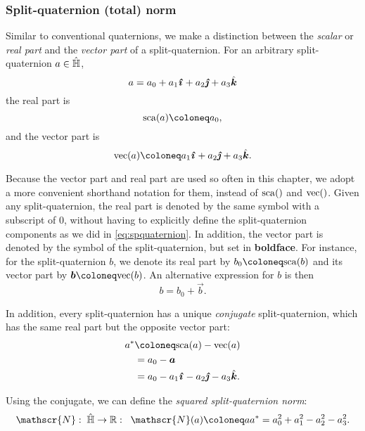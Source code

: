 \subsubsection{Split-quaternion (total) norm} 
Similar to conventional quaternions, we make a distinction between the \emph{scalar} or \emph{real part} and the \emph{vector part} of a split-quaternion. For an arbitrary split-quaternion \(a \in \hat{\mathbb{H}}\), \cite{Jafari2014}
\begin{equation}
     a = \quat{a_0}{a_1}{a_2}{a_3}
     \label{eq:spquaternion}
\end{equation}
the real part is 
\begin{equation}
    \scapart{a} \coloneq a_0,
\end{equation}
and the vector part is 
\begin{equation} 
    \vecpart{a} \coloneq \quatvec{a_1}{a_2}{a_3}.
\end{equation}

Because the vector part and real part are used so often in this chapter, we adopt a more convenient shorthand notation for them, instead of $\mathrm{sca}\qty()$ and $\mathrm{vec}\qty()$. Given any split-quaternion, the real part is denoted by the same symbol with a subscript of 0, without having to explicitly define the split-quaternion components as we did in \cref{eq:spquaternion}. In addition, the vector part is denoted by the symbol of the split-quaternion, but set in \textbf{boldface}. For instance, for the split-quaternion $b$, we denote its real part by $b_0 \coloneq \scapart{b}$ and its vector part by $\vec{b} \coloneq \vecpart{b}$. An alternative expression for $b$ is then
\begin{equation}
     b = b_0 + \vec{b}.
\end{equation}

In addition, every split-quaternion has a unique \emph{conjugate} split-quaternion, which has the same real part but the opposite vector part:
\begin{equation}
    \begin{split}
     \conj{a} &\coloneq \scapart{a} - \vecpart{a} \\
              &= a_0 - \vec{a}  \\
              &= a_0 - a_1\quati - a_2\quatj - a_3\quatk.
     \end{split}
\end{equation}

Using the conjugate, we can define the \emph{squared split-quaternion norm}:
\begin{equation}
    \mathscr{N}:\;\spquaternions \to \real:\;\;\mathscr{N}(a) \coloneq a\conj{a} = a_0^2 + a_1^2 - a_2^2 - a_3^2. 
    \label{eq:quat_norm}
\end{equation}

